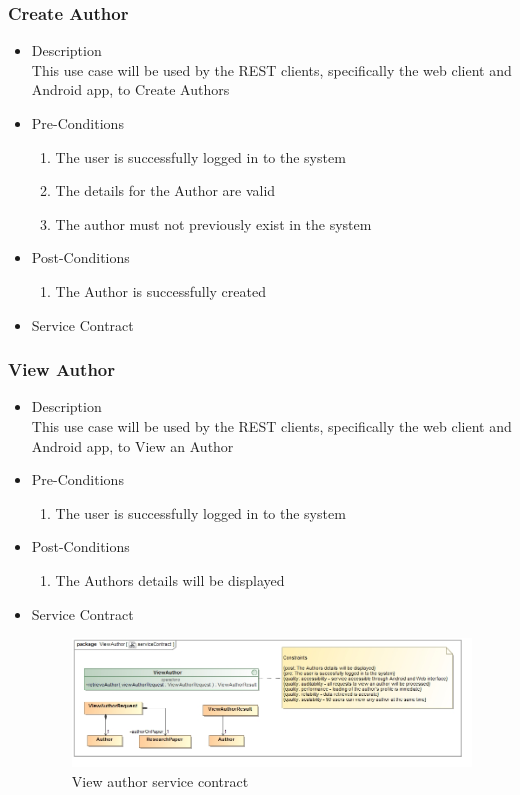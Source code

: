 \documentclass[a4paper,10pt]{article}
\begin{document}
\subsubsection{Create Author}
	\begin{itemize}
		\item Description\\
			This use case will be used by the REST clients, specifically the web client and Android app, to Create Authors
		\item Pre-Conditions
			\begin{enumerate}
				\item The user is successfully logged in to the system
				\item The details for the Author are valid
				\item The author must not previously exist in the system 
			\end{enumerate}
		\item Post-Conditions
			\begin{enumerate}
				\item The Author is successfully created	
			\end{enumerate}
		\item Service Contract
	\end{itemize}

\subsubsection{View Author}
	\begin{itemize}
		\item Description\\
			This use case will be used by the REST clients, specifically the web client and Android app, to View an Author
		\item Pre-Conditions
			\begin{enumerate}
				\item The user is successfully logged in to the system
			\end{enumerate}
		\item Post-Conditions
			\begin{enumerate}
				\item The Authors details will be displayed
						
			\end{enumerate}
		\item Service Contract
		\begin{figure}[H]
			\includegraphics[scale=0.5]{ViewAuthorServiceContract}
			\caption{View author service contract}
		\end{figure}
	\end{itemize}
	
\end{document}
